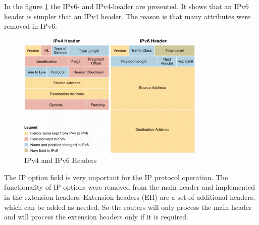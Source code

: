 \documentclass[a4paper]{report}
\begin{document}
In the figure \ref{fig:IPv4_IPv6_Header} the IPv6- and IPv4-header are presented. It shows that an IPv6 header is simpler that an IPv4 header. The reason is that many attributes were removed in IPv6.
\begin{figure}[htb]
	\centering
	\includegraphics[keepaspectratio,width=0.8\textwidth]{ipv6_ipv4_headers}
	\caption {IPv4 and IPv6 Headers \parencite{cisco2006}}
	\label{fig:IPv4_IPv6_Header}
\end{figure}

The IP option field is very important for the IP protocol operation. The functionality of IP options were removed from the main header and implemented in the extension headers. Extension headers (EH) are a set of additional headers, which can be added as needed. So the routers will only process the main header and will process the extension headers only if it is required.
\end{document}
